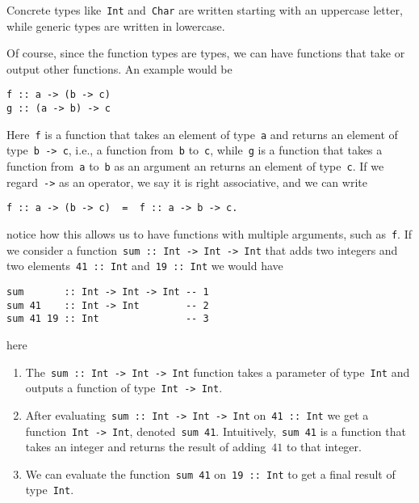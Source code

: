 \documentclass[a4paper]{article}
\theoremstyle{plain}
\theoremstyle{definition}
\newcommand{\ie}{{i}.{e}., }
\begin{document}
Concrete types like~\texttt{Int} and~\texttt{Char} are
written starting with an uppercase letter, while generic types are written in
lowercase.

Of course, since the function types are types, we can have functions that take
or output other functions. An example would be
\begin{verbatim}
f :: a -> (b -> c)
g :: (a -> b) -> c
\end{verbatim}
Here~\texttt{f} is a function that takes an element of
type~\texttt{a} and returns an element of
type~\texttt{b -> c}, \ie a function from~\texttt{b}
to~\texttt{c}, while~\texttt{g} is a function that
takes a function from~\texttt{a} to~\texttt{b} as an
argument an returns an element of type~\texttt{c}. If we
regard~\texttt{->} as an operator, we say it is right associative,
and we can write
\begin{verbatim}
f :: a -> (b -> c)  =  f :: a -> b -> c.
\end{verbatim}
notice how this allows us to have functions with multiple arguments, such
as~\texttt{f}. If we consider a function~\texttt{sum
:: Int -> Int -> Int} that adds two integers and two
elements~\texttt{41 :: Int} and~\texttt{19 :: Int} we
would have
\begin{verbatim}
sum       :: Int -> Int -> Int -- 1
sum 41    :: Int -> Int        -- 2
sum 41 19 :: Int               -- 3
\end{verbatim}
here
\begin{enumerate}
    \item The~\texttt{sum :: Int -> Int -> Int} function takes a
        parameter of type~\texttt{Int} and outputs a function of
        type~\texttt{Int -> Int}.
    \item After evaluating~\texttt{sum :: Int -> Int -> Int}
        on~\texttt{41 :: Int} we get a
        function~\texttt{Int -> Int},
        denoted~\texttt{sum 41}.
        Intuitively,~\texttt{sum 41} is a function that takes an
        integer and returns the result of adding~\(41\) to that integer.
    \item We can evaluate the function~\texttt{sum 41}
        on~\texttt{19 :: Int} to get a final result of
        type~\texttt{Int}.
\end{enumerate}
\end{document}
